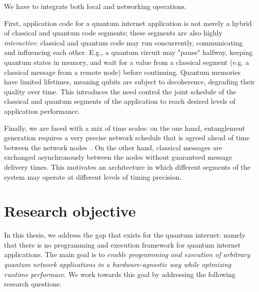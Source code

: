 We have to integrate both local and networking operations.

First, application code for a quantum internet application is not merely a hybrid of classical and quantum code segments; these segments are also highly \textit{interactive}: classical and quantum code may run concurrently, communicating and influencing each other.
E.g., a quantum circuit may "pause" halfway, keeping quantum states in memory, and wait for a value from a classical segment (e.g. a classical message from a remote node) before continuing.
Quantum memories have limited lifetimes, meaning qubits are subject to decoherence, degrading their quality over time. This introduces the need 
control the joint schedule of the classical and quantum segments of the application to reach desired levels of application performance.

Finally, we are faced with a mix of time scales:
on the one hand, entanglement generation requires a very precise network schedule that is agreed ahead of time between the network nodes~\cite{dahlberg2019link}. On the other hand, classical messages are exchanged asynchronously between the nodes without guaranteed message delivery times. This motivates an architecture in which different segments of the system may operate at different levels of timing precision. 


\section{Research objective}
In this thesis, we address the gap that exists for the quantum internet: namely that there is no programming and execution framework for quantum internet applications.
The main goal is to \emph{enable programming and execution of arbitrary quantum network applications in a hardware-agnostic way while optmizing runtime performace}.
We work towards this goal by addressing the following research questions:


